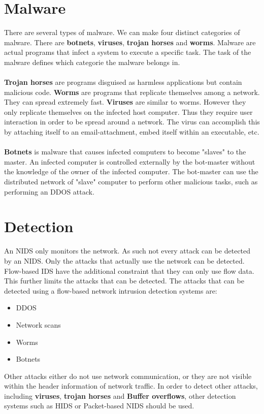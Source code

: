 \section{Malware}
There are several types of malware. We can make four distinct categories of malware. There are \textbf{botnets}, \textbf{viruses}, \textbf{trojan horses} and \textbf{worms}. Malware are actual programs that infect a system to execute a specific task. The task of the malware defines which categorie the malware belongs in.\\
\\
\textbf{Trojan horses} are programs disguised as harmless applications but contain malicious code. \textbf{Worms} are programs that replicate themselves among a network.  They can spread extremely fast. \textbf{Viruses} are similar to worms. However they only replicate themselves on the infected host computer. Thus they require user interaction in order to be spread around a network. The virus can accomplish this by attaching itself to an email-attachment, embed itself within an executable, etc. \\
\\
\textbf{Botnets} is malware that causes infected computers to become "slaves" to the master. An infected computer is controlled externally by the bot-master without the knowledge of the owner of the infected computer. The bot-master can use the distributed network of "slave" computer to perform other malicious tasks, such as performing an DDOS attack. \cite{IPFlow}

\section{Detection}
An NIDS only monitors the network. As such not every attack can be detected by an NIDS. Only the attacks that actually use the network can be detected. Flow-based IDS have the additional constraint that they can only use flow data. This further limits the attacks that can be detected. The attacks that can be detected using a flow-based network intrusion detection systems are:
\begin{itemize}
\item DDOS
\item Network scans
\item Worms
\item Botnets
\end{itemize}
Other attacks either do not use network communication, or they are not visible within the header information of network traffic. In order to detect other attacks, including \textbf{viruses}, \textbf{trojan horses} and \textbf{Buffer overflows}, other detection systems such as HIDS or Packet-based NIDS should be used.

